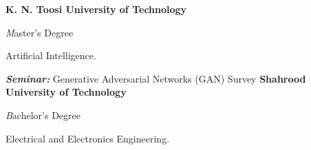 \begin{rubric}{}

\entry*[2020 -- 2023]%
	\textbf{K. N. Toosi University of Technology} \par {\emph Master's Degree} \par
	{Artificial Intelligence}.
        \par \textbf{\emph{Seminar:}} Generative Adversarial Networks (GAN) Survey
% 
\entry*[2015 -- 2020 ]%
	\textbf{ Shahrood University of Technology} \par {\emph Bachelor's Degree} \par
	{Electrical and Electronics Engineering}.

\end{rubric}